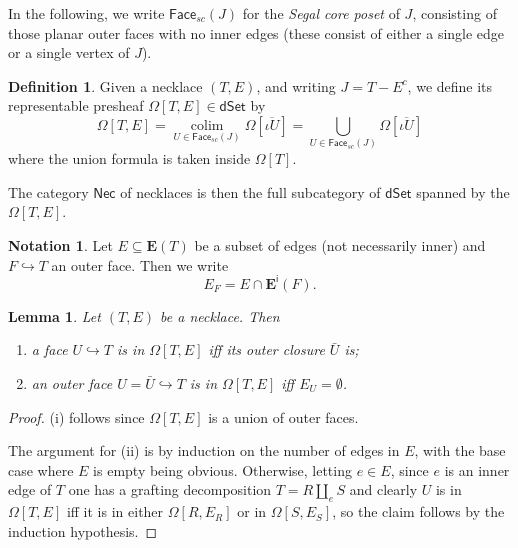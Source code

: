 \documentclass[a4paper,10pt
,draft
]{article}%
\numberwithin{equation}{section}
\numberwithin{figure}{section}
\newtheorem{lemma}[equation]{Lemma}%
\theoremstyle{definition} %
\newtheorem{definition}[equation]{Definition}%
\newtheorem{notation}[equation]{Notation}%
\DeclareMathOperator{\colim}{colim}%
\newcommand{\1}{\ensuremath{\mathbbm 1}}%
\begin{document}
In the following, we write 
$\mathsf{Face}_{sc}(J)$ for the \emph{Segal core poset} of $J$,
consisting of those planar outer faces with no inner edges
(these consist of either a single edge or a single vertex of $J$).

\begin{definition}
      Given a necklace 
      $(T,E)$, 
      and writing $J = T-E^c$,
      we define its representable presheaf
      $\Omega[T,E] \in \mathsf{dSet}$ by
      \begin{equation}
            \Omega[T,E] 
            = 
            \underset{U \in \mathsf{Face}_{sc}(J)}{\colim}
            \Omega[\overline{\iota U}]
            =
            \bigcup_{U \in \mathsf{Face}_{sc}(J)} 
            \Omega[\overline{\iota U}]
      \end{equation}
      where the union formula is taken inside $\Omega[T]$.
      
      The category $\mathsf{Nec}$ of necklaces is then the full subcategory of $\mathsf{dSet}$
      spanned by the $\Omega[T,E]$.
\end{definition}


\begin{notation}
  	Let $E \subseteq \boldsymbol{E}(T)$
  	be a subset of edges (not necessarily inner)
  	and $F \hookrightarrow T$ an outer face.
  	Then we write
\[
  	E_F = E \cap \boldsymbol{E}^{\mathsf{i}}(F).
\]
\end{notation}



\begin{lemma}\label{FACEINNECK LEM}
	Let $(T,E)$ be a necklace. Then
\begin{enumerate}[label=(\roman*)]
	\item a face $U \hookrightarrow T$
	is in $\Omega[T,E]$
	iff its outer closure $\bar{U}$ is; 
	\item an outer face 
	$U = \bar{U} \hookrightarrow T$
	is in $\Omega[T,E]$ iff $E_U = \emptyset$.
\end{enumerate}
\end{lemma}

\begin{proof}
	(i) follows since $\Omega[T,E]$
	is a union of outer faces.
	
	The argument for (ii) is by induction on the number of edges in $E$,
	with the base case where $E$ is empty being obvious.
%	
	Otherwise, letting $e\in E$, since $e$ is an inner edge of $T$
	one has a grafting decomposition
	$T = R \amalg_e S$
	and clearly 
	$U$ is in $\Omega[T,E]$
	iff it is in either
	$\Omega[R,E_R]$ or in $\Omega[S,E_S]$,
	so the claim follows by the induction hypothesis.
\end{proof}
\end{document}

